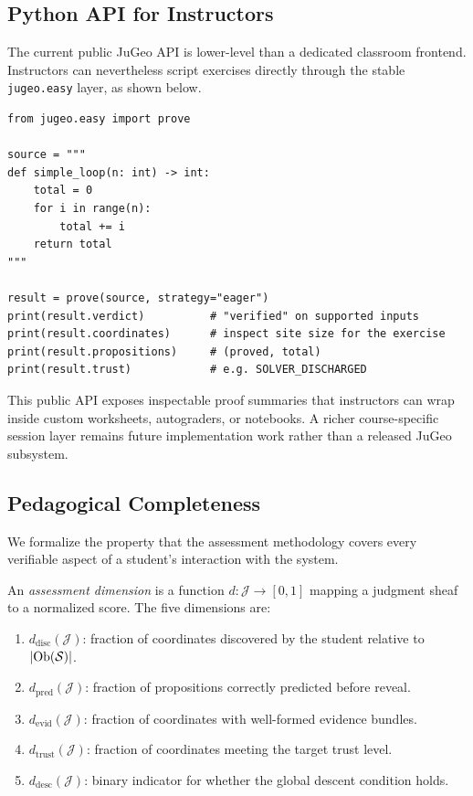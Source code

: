 \documentclass[11pt]{article}
\begin{document}
\subsection{Python API for Instructors}

The current public JuGeo API is lower-level than a dedicated classroom
frontend. Instructors can nevertheless script exercises directly through the
stable \texttt{jugeo.easy} layer, as shown below.

\begin{lstlisting}[style=jugeo-python]
from jugeo.easy import prove

source = """
def simple_loop(n: int) -> int:
    total = 0
    for i in range(n):
        total += i
    return total
"""

result = prove(source, strategy="eager")
print(result.verdict)          # "verified" on supported inputs
print(result.coordinates)      # inspect site size for the exercise
print(result.propositions)     # (proved, total)
print(result.trust)            # e.g. SOLVER_DISCHARGED
\end{lstlisting}

This public API exposes inspectable proof summaries that instructors can wrap
inside custom worksheets, autograders, or notebooks. A richer course-specific
session layer remains future implementation work rather than a released JuGeo
subsystem.

\subsection{Pedagogical Completeness}

We formalize the property that the assessment methodology covers every
verifiable aspect of a student's interaction with the system.

\begin{definition}
An \emph{assessment dimension} is a function
$d : \mathcal{J} \to [0,1]$ mapping a judgment sheaf to a normalized score.
The five dimensions are:
\begin{enumerate}
  \item $d_{\mathrm{disc}}(\mathcal{J})$: fraction of coordinates discovered
        by the student relative to $|\mathrm{Ob}(\mathcal{S})|$.
  \item $d_{\mathrm{pred}}(\mathcal{J})$: fraction of propositions correctly
        predicted before reveal.
  \item $d_{\mathrm{evid}}(\mathcal{J})$: fraction of coordinates with
        well-formed evidence bundles.
  \item $d_{\mathrm{trust}}(\mathcal{J})$: fraction of coordinates meeting
        the target trust level.
  \item $d_{\mathrm{desc}}(\mathcal{J})$: binary indicator for whether the
        global descent condition holds.
\end{enumerate}
\end{definition}
\end{document}
